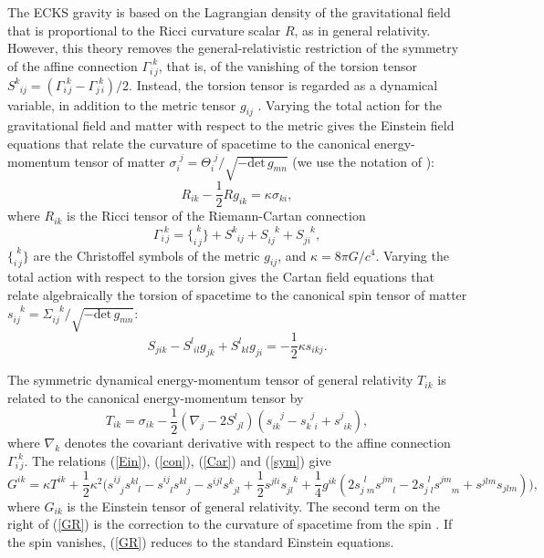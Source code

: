 \documentclass[prd,onecolumn,nofootinbib,showkeys]{revtex4}
\begin{document}
The ECKS gravity is based on the Lagrangian density of the gravitational field that is proportional to the Ricci curvature scalar $R$, as in general relativity.
However, this theory removes the general-relativistic restriction of the symmetry of the affine connection $\Gamma^{\,\,k}_{i\,j}$, that is, of the vanishing of the torsion tensor $S^k_{\phantom{k}ij}=(\Gamma^{\,\,k}_{i\,j}-\Gamma^{\,\,k}_{j\,i})/2$.
Instead, the torsion tensor is regarded as a dynamical variable, in addition to the metric tensor $g_{ij}$ \cite{Kib,Sci1,Sci2,HHKN,Lord}.
Varying the total action for the gravitational field and matter with respect to the metric gives the Einstein field equations that relate the curvature of spacetime to the canonical energy-momentum tensor of matter $\sigma_i^{\phantom{i}j}=\Theta_i^{\phantom{i}j}/\sqrt{-\mbox{det}\,g_{mn}}$ (we use the notation of \cite{Niko2}):
\begin{equation}
R_{ik}-\frac{1}{2}Rg_{ik}=\kappa\sigma_{ki},
\label{Ein}
\end{equation}
where $R_{ik}$ is the Ricci tensor of the Riemann-Cartan connection
\begin{equation}
\Gamma^{\,\,k}_{i\,j}=\{^{\,\,k}_{i\,j}\}+S^k_{\phantom{k}ij}+S_{ij}^{\phantom{ij}k}+S_{ji}^{\phantom{ji}k},
\label{con}
\end{equation}
$\{^{\,\,k}_{i\,j}\}$ are the Christoffel symbols of the metric $g_{ij}$, and $\kappa=8\pi G/c^4$.
Varying the total action with respect to the torsion gives the Cartan field equations that relate algebraically the torsion of spacetime to the canonical spin tensor of matter $s_{ij}^{\phantom{ij}k}=\Sigma_{ij}^{\phantom{ij}k}/\sqrt{-\mbox{det}\,g_{mn}}$:
\begin{equation}
S_{jik}-S^l_{\phantom{l}il}g_{jk}+S^l_{\phantom{l}kl}g_{ji}=-\frac{1}{2}\kappa s_{ikj}.
\label{Car}
\end{equation}

The symmetric dynamical energy-momentum tensor of general relativity $T_{ik}$ \cite{LL} is related to the canonical energy-momentum tensor by
\begin{equation}
T_{ik}=\sigma_{ik}-\frac{1}{2}(\nabla_j-2S^l_{\phantom{l}jl})(s_{ik}^{\phantom{ik}j}-s_{k\phantom{j}i}^{\phantom{k}j}+s^j_{\phantom{j}ik}),
\label{sym}
\end{equation}
where $\nabla_k$ denotes the covariant derivative with respect to the affine connection $\Gamma^{\,\,k}_{i\,j}$.
The relations (\ref{Ein}), (\ref{con}), (\ref{Car}) and (\ref{sym}) give
\begin{equation}
G^{ik}=\kappa T^{ik}+\frac{1}{2}\kappa^2\biggl(s^{ij}_{\phantom{ij}j}s^{kl}_{\phantom{kl}l}-s^{ij}_{\phantom{ij}l}s^{kl}_{\phantom{kl}j}-s^{ijl}s^k_{\phantom{k}jl}+\frac{1}{2}s^{jli}s_{jl}^{\phantom{jl}k}+\frac{1}{4}g^{ik}(2s^{\phantom{j}l}_{j\phantom{l}m}s^{jm}_{\phantom{jm}l}-2s^{\phantom{j}l}_{j\phantom{l}l}s^{jm}_{\phantom{jm}m}+s^{jlm}s_{jlm})\biggr),
\label{GR}
\end{equation}
where $G_{ik}$ is the Einstein tensor of general relativity.
The second term on the right of (\ref{GR}) is the correction to the curvature of spacetime from the spin \cite{HHKN,HHK}.
If the spin vanishes, (\ref{GR}) reduces to the standard Einstein equations.
\end{document}
